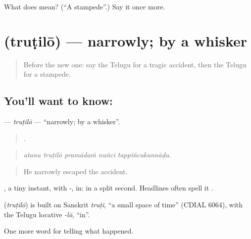 \begin{tcolorbox}[breakable,colback=teal!4,colframe=teal!35!black,title={Before you move on}]
What does  mean? (\textquotedblleft{}A stampede\textquotedblright{}.) Say it once more.
\end{tcolorbox}
\section[\texorpdfstring{\te{త్రుటిలో} (truṭilō)}{త్రుటిలో (truṭilō)}]{ (truṭilō) — narrowly; by a whisker}

\label{lesson:TE-C343-trutilo}



\begin{quote}
Before the new one: say the Telugu for a tragic accident, then the Telugu for a stampede.
\end{quote}

\subsection*{You'll want to know: }
\textbf{} — \emph{truṭilō} — \textquotedblleft{}narrowly; by a whisker\textquotedblright{}.

\begin{quote}
    .
\end{quote}

\begin{quote}
\emph{atanu truṭilō pramādaṁ nuñci tappiñcukunnāḍu.}
\end{quote}

\begin{quote}
He narrowly escaped the accident.
\end{quote}

, a tiny instant, with -, in: in a split second. Headlines often spell it .

\begin{cousinweb}
\textbf{} (\emph{truṭilō}) is built on Sanskrit \emph{truṭi}, \textquotedblleft{}a small space of time\textquotedblright{} (CDIAL 6064), with the Telugu locative \emph{-lō}, \textquotedblleft{}in\textquotedblright{}.
\end{cousinweb}

\begin{grammarlens}[title={What you've built}]
One more word for telling what happened.
\end{grammarlens}

